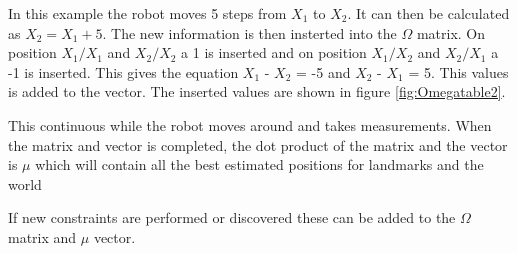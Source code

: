 \FloatBarrier


In this example the robot moves 5 steps from $X_1$ to $X_2$. It can then be calculated as $X_2 = X_1 + 5$. The new information is then insterted into the $\Omega$ matrix. On position $X_1/X_1$ and $X_2/X_2$ a 1 is inserted and on position $X_1/X_2$ and $X_2/X_1$ a -1 is inserted. This gives the equation $X_1$ - $X_2$ = -5 and $X_2$ - $X_1$ = 5. This values is added to the vector. The inserted values are shown in figure \ref{fig:Omegatable2}.


This continuous while the robot moves around and takes measurements. When the matrix and vector is completed, the dot product of the matrix and the vector is $\mu$ which will contain all the best estimated positions for landmarks and the world

If new constraints are performed or discovered these can be added to the $\Omega$ matrix and $\mu$ vector.